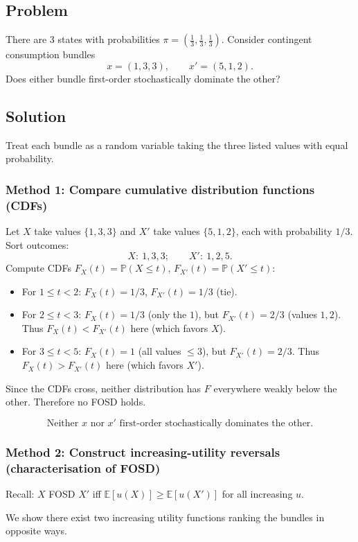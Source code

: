 \documentclass[12pt]{article}
\newcommand{\E}{\mathbb{E}}
\newcommand{\cdf}{F}
\begin{document}
\subsection*{Problem}
There are 3 states with probabilities \(\pi=(\tfrac13,\tfrac13,\tfrac13)\).
Consider contingent consumption bundles
\[
x=(1,3,3),\qquad x'=(5,1,2).
\]
Does either bundle first-order stochastically dominate the other?

\subsection*{Solution}
Treat each bundle as a random variable taking the three listed values with equal probability.

\subsubsection*{Method 1: Compare cumulative distribution functions (CDFs)}
Let \(X\) take values \(\{1,3,3\}\) and \(X'\) take values \(\{5,1,2\}\), each with probability \(1/3\).
Sort outcomes:
\[
X:\ 1,3,3;\qquad X':\ 1,2,5.
\]
Compute CDFs \(\cdf_X(t)=\mathbb{P}(X\le t)\), \(\cdf_{X'}(t)=\mathbb{P}(X'\le t)\):
\begin{itemize}[leftmargin=*]
\item For \(1\le t<2\): \(\cdf_X(t)=1/3\), \(\cdf_{X'}(t)=1/3\) (tie).
\item For \(2\le t<3\): \(\cdf_X(t)=1/3\) (only the \(1\)), but \(\cdf_{X'}(t)=2/3\) (values \(1,2\)).
Thus \(\cdf_X(t) < \cdf_{X'}(t)\) here (which favors \(X\)).
\item For \(3\le t<5\): \(\cdf_X(t)=1\) (all values \(\le 3\)), but \(\cdf_{X'}(t)=2/3\).
Thus \(\cdf_X(t) > \cdf_{X'}(t)\) here (which favors \(X'\)).
\end{itemize}
Since the CDFs cross, neither distribution has \(\cdf\) everywhere weakly below the other.
Therefore no FOSD holds.

\[
\boxed{\text{Neither }x\text{ nor }x'\text{ first-order stochastically dominates the other.}}
\]

\subsubsection*{Method 2: Construct increasing-utility reversals (characterisation of FOSD)}
Recall: \(X\) FOSD \(X'\) iff \(\E[u(X)]\ge \E[u(X')]\) for all increasing \(u\).

We show there exist two increasing utility functions ranking the bundles in opposite ways.
\end{document}
